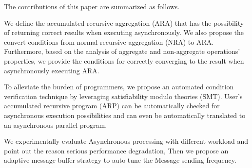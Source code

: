 The contributions of this paper are summarized as follows.
\begin{itemize}
	\item We define the accumulated recursive aggregation (ARA) that has the possibility of returning correct results when executing asynchronously. We also propose the convert conditions from normal recursive aggregation (NRA) to ARA. Furthermore, based on the analysis of aggregate and non-aggregate operations' properties, we provide the conditions for correctly converging to the result when asynchronously executing ARA.
	
	\item To alleviate the burden of programmers, we propose an automated condition verification technique by leveraging satisfiability modulo theories (SMT). User's accumulated recursive program (ARP) can be automatically checked for asynchronous execution possibilities and can even be automatically translated to an asynchronous parallel program.
	
		
	{\color{red}
	\item We experimentally evaluate Asynchronous processing with different workload and point out the reason  serious performance degradation, Then we propose an adaptive message buffer strategy to auto tune the Message sending frequency.

}
\end{itemize}
